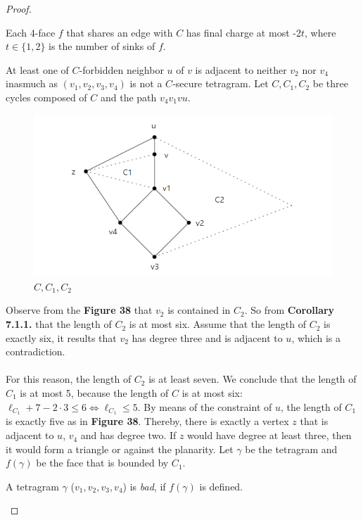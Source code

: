 \begin{proof}
\begin{itemize}
\begin{itemize}
        \begin{observation}
        Each 4-face $f$ that shares an edge with $C$ has final charge at most -2$t$, where $t \in \{1, 2\}$ is the number of sinks of $f$.
        \end{observation}
        
        At least one of $C$-forbidden neighbor $u$ of $v$ is adjacent to neither $v_2$ nor $v_4$ inasmuch as $(v_1, v_2, v_3, v_4)$ is not a $C$-secure tetragram. Let $C, C_1, C_2$ be three cycles composed of $C$ and the path $v_4v_1vu$. 
        \begin{figure}[H] %
            \centering %
            \includegraphics[width=0.8 \textwidth]{figure/cc1c2.png} 
            \caption{$C, C_1, C_2$} %
            \label{figure} %
        \end{figure}
        Observe from the \textbf{Figure 38} that $v_2$ is contained in $C_2$. So from \textbf{Corollary 7.1.1.} that the length of $C_2$ is at most six. Assume that the length of $C_2$ is exactly six, it results that $v_2$ has degree three and is adjacent to $u$, which is a contradiction.\\ \\
        For this reason, the length of $C_2$ is at least seven. We conclude that the length of $C_1$ is at most 5, because the length of $C$ is at most six: $\ell_{C_1} + 7 - 2 \cdot 3 \leq 6 \Longleftrightarrow \ell_{C_1} \leq 5$. By means of the constraint of $u$, the length of $C_1$ is exactly five as in \textbf{Figure 38}. Thereby, there is exactly a vertex $z$ that is adjacent to $u$, $v_4$ and has degree two. If $z$ would have degree at least three, then it would form a triangle or against the planarity. Let $\gamma$ be the tetragram and $f(\gamma)$ be the face that is bounded by $C_1$. 
        \begin{definition}
        A tetragram $\gamma$ ($v_1, v_2, v_3, v_4$) is \textit{bad}, if $f(\gamma)$ is defined. 
        \end{definition}
        

\end{itemize}
\end{itemize}
\end{proof}
